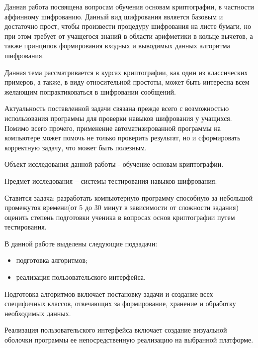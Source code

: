 \Introduction

\par
Данная работа посвящена вопросам обучения основам криптографии, в частности аффинному шифрованию. Данный вид шифрования является базовым и достаточно прост, чтобы произвести процедуру шифрования на листе бумаги, но при этом требует от учащегося знаний в области арифметики в кольце вычетов, а также принципов формирования входных и выводимых данных алгоритма шифрования.
\par
Данная тема рассматривается в курсах криптографии, как один из классических примеров, а также, в виду относительной простоты, может быть интересна всем желающим попрактиковаться в шифровании сообщений.
\par
Актуальность поставленной задачи связана прежде всего с возможностью использования программы для проверки навыков шифрования у учащихся. Помимо всего прочего, применение автоматизированной программы на компьютере может помочь не только проверить результат, но и сформировать корректную задачу, что может быть полезным.
\par
Объект исследования данной работы - обучение основам криптографии.
\par
Предмет исследования – системы тестирования навыков шифрования.
\par
Ставится задача: разработать компьютерную программу способную за небольшой промежуток времени(от 5 до 30 минут в зависимости от сложности задания) оценить степень подготовки ученика в вопросах основ криптографии путем тестирования.
\par
В данной работе выделены следующие подзадачи:
\begin{itemize}
	\item подготовка алгоритмов;
	\item реализация пользовательского интерфейса.
\end{itemize}
\par
Подготовка алгоритмов включает постановку задачи и создание всех специфичных классов, отвечающих за формирование, хранение и обработку необходимых данных.
\par
Реализация пользовательского интерфейса включает создание визуальной оболочки программы ее непосредственную реализацию на выбранной платформе.
